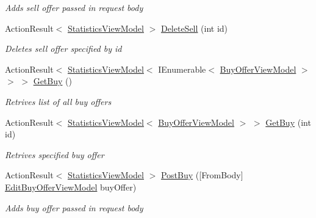 \begin{DoxyCompactItemize}
\begin{DoxyCompactList}\small\item\em Adds sell offer passed in request body \end{DoxyCompactList}\item 
Action\+Result$<$ \mbox{\hyperlink{class_gielda_l2_1_1_a_p_i_1_1_view_models_1_1_view_1_1_statistics_view_model}{Statistics\+View\+Model}} $>$ \mbox{\hyperlink{class_gielda_l2_1_1_a_p_i_1_1_controllers_1_1_offers_controller_a8290b7e739c2756489ff7d00b160fb82}{Delete\+Sell}} (int id)
\begin{DoxyCompactList}\small\item\em Deletes sell offer specified by id \end{DoxyCompactList}\item 
Action\+Result$<$ \mbox{\hyperlink{class_gielda_l2_1_1_a_p_i_1_1_view_models_1_1_view_1_1_statistics_view_model}{Statistics\+View\+Model}}$<$ I\+Enumerable$<$ \mbox{\hyperlink{class_gielda_l2_1_1_a_p_i_1_1_view_models_1_1_view_1_1_buy_offer_view_model}{Buy\+Offer\+View\+Model}} $>$ $>$ $>$ \mbox{\hyperlink{class_gielda_l2_1_1_a_p_i_1_1_controllers_1_1_offers_controller_a0c19e9a3ee9a48231d20f52d57048c22}{Get\+Buy}} ()
\begin{DoxyCompactList}\small\item\em Retrives list of all buy offers \end{DoxyCompactList}\item 
Action\+Result$<$ \mbox{\hyperlink{class_gielda_l2_1_1_a_p_i_1_1_view_models_1_1_view_1_1_statistics_view_model}{Statistics\+View\+Model}}$<$ \mbox{\hyperlink{class_gielda_l2_1_1_a_p_i_1_1_view_models_1_1_view_1_1_buy_offer_view_model}{Buy\+Offer\+View\+Model}} $>$ $>$ \mbox{\hyperlink{class_gielda_l2_1_1_a_p_i_1_1_controllers_1_1_offers_controller_a1310ed7960becb921d6b9285ae375c95}{Get\+Buy}} (int id)
\begin{DoxyCompactList}\small\item\em Retrives specified buy offer \end{DoxyCompactList}\item 
Action\+Result$<$ \mbox{\hyperlink{class_gielda_l2_1_1_a_p_i_1_1_view_models_1_1_view_1_1_statistics_view_model}{Statistics\+View\+Model}} $>$ \mbox{\hyperlink{class_gielda_l2_1_1_a_p_i_1_1_controllers_1_1_offers_controller_a2c53fc87e733d63b5f3f634ad716689b}{Post\+Buy}} (\mbox{[}From\+Body\mbox{]} \mbox{\hyperlink{class_gielda_l2_1_1_a_p_i_1_1_view_models_1_1_edit_1_1_edit_buy_offer_view_model}{Edit\+Buy\+Offer\+View\+Model}} buy\+Offer)
\begin{DoxyCompactList}\small\item\em Adds buy offer passed in request body \end{DoxyCompactList}\item 

\end{DoxyCompactItemize}
